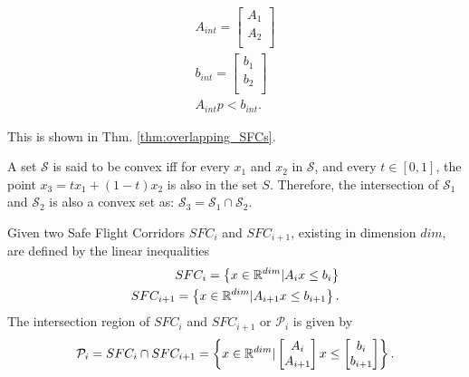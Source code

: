 \begin{align}
  A_{int} =
    \begin{bmatrix}
      A_1\\
      A_2\\
    \end{bmatrix}\\
  b_{int} =
  \begin{bmatrix}
    b_1\\
    b_2\\
  \end{bmatrix}\\
  A_{int} p < b_{int}.
\end{align}


This is shown in Thm. \ref{thm:overlapping_SFCs}.

\begin{theorem}\label{thm:overlapping_SFCs}
    A set $\mathcal{S}$ is said to be convex iff for every $x_1$ and $x_2$ in $\mathcal{S}$, and every $t \in \left[0,1\right]$, the point $x_3 = tx_1 + (1-t)x_2$ is also in the set $S$. 
    Therefore, the intersection of $\mathcal{S}_1$ and $\mathcal{S}_2$ is also a convex set as: $\mathcal{S}_3 = \mathcal{S}_1 \cap \mathcal{S}_2$.
    
    Given two Safe Flight Corridors $SFC_i$ and $SFC_{i+1}$, existing in dimension $dim$, are defined by the linear inequalities
    \begin{align}
        SFC_i = \left\{x \in \mathbb{R}^{dim} \space | A_i x \leq b_i\space \right\}\\
        SFC_{i+1} = \left\{x \in \mathbb{R}^{dim} \space | A_{i+1} x \leq b_{i+1}\space \right\}.
    \end{align}
    The intersection region of $SFC_i$ and $SFC_{i+1}$ or $\mathcal{P}_i$ is given by
    \begin{align}
        \mathcal{P}_i = SFC_i \cap SFC_{i+1} = \left\{x \in \mathbb{R}^{dim} \space |
        \begin{bmatrix}
            A_i\\
            A_{i+1}\\
        \end{bmatrix}
        x \leq
        \begin{bmatrix}
            b_i\\
            b_{i+1}\\
        \end{bmatrix}
        \space \right\}.
    \end{align}
\end{theorem}

